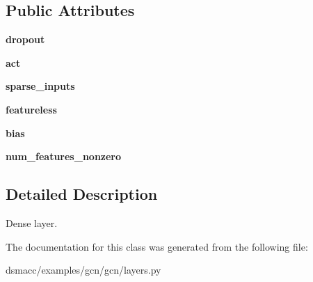 \subsection*{Public Attributes}
\begin{DoxyCompactItemize}
\item 
\mbox{\label{classgcn_1_1layers_1_1Dense_ab82e6da45a8ad3bb1825743897261756}} 
{\bfseries dropout}
\item 
\mbox{\label{classgcn_1_1layers_1_1Dense_abd466f83758bcc232c5557a2f4491b41}} 
{\bfseries act}
\item 
\mbox{\label{classgcn_1_1layers_1_1Dense_a9c8b88a50a02c7ea676f4417c293cff1}} 
{\bfseries sparse\+\_\+inputs}
\item 
\mbox{\label{classgcn_1_1layers_1_1Dense_a2db361284820df1c8ab130b3c953550a}} 
{\bfseries featureless}
\item 
\mbox{\label{classgcn_1_1layers_1_1Dense_a5d5869ddd3f8296ac3117eed676f43bb}} 
{\bfseries bias}
\item 
\mbox{\label{classgcn_1_1layers_1_1Dense_a20321a0a132398aab77c28d6b2ca2a50}} 
{\bfseries num\+\_\+features\+\_\+nonzero}
\end{DoxyCompactItemize}


\subsection{Detailed Description}
\begin{DoxyVerb}Dense layer.\end{DoxyVerb}
 

The documentation for this class was generated from the following file\+:\begin{DoxyCompactItemize}
\item 
dsmacc/examples/gcn/gcn/layers.\+py\end{DoxyCompactItemize}
